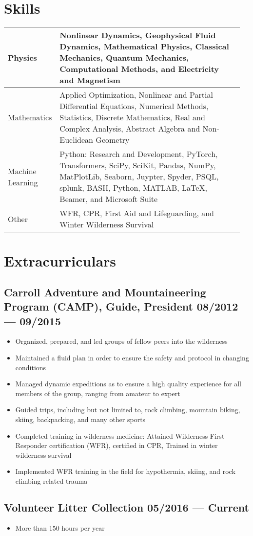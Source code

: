 \documentclass[letterpaper,11pt]{article}
\begin{document}
\section{\color{cvblue}Skills}
\vspace{-.25in}
\begin{table}[h!]
    \centering
    \begin{tabular}{p{0.16\linewidth} || p{0.8\linewidth}}
         Physics& Nonlinear Dynamics, Geophysical Fluid Dynamics, Mathematical Physics, Classical Mechanics,
Quantum Mechanics, Computational Methods, and Electricity and Magnetism \\\hline
         Mathematics& Applied Optimization, Nonlinear and Partial Differential Equations, Numerical Methods, Statistics, Discrete Mathematics, Real and Complex Analysis, Abstract Algebra and Non-Euclidean Geometry \\\hline
         Machine Learning & Python: Research and Development, PyTorch, Transformers, SciPy, SciKit, Pandas, NumPy, MatPlotLib, Seaborn, Juypter, Spyder, PSQL, splunk, BASH, Python, MATLAB, \LaTeX,  Beamer, and Microsoft Suite \\\hline
         Other& WFR, CPR, First Aid and Lifeguarding, and Winter Wilderness Survival\\\hline
    \end{tabular}
\end{table}



\section{\color{cvblue}Extracurriculars }

\subsection*{{\color{cvblue}Carroll Adventure and Mountaineering Program (CAMP), Guide, President} \hfill 08/2012 --- 09/2015} 
    \begin{itemize}
\item  Organized, prepared, and led groups of fellow peers into the wilderness
\item  Maintained a fluid plan in order to ensure the safety and protocol in changing conditions
\item  Managed dynamic expeditions as to ensure a high quality experience for all members of the group, ranging from amateur to expert
\item  Guided trips, including but not limited to, rock climbing, mountain biking, skiing, backpacking, and
many other sports
\item  Completed training in wilderness medicine: Attained Wilderness First Responder certification (WFR), certified in CPR, Trained in winter wilderness survival
\item Implemented WFR training in the field for hypothermia, skiing, and  rock climbing related trauma      \end{itemize}



\subsection*{\color{cvblue}Volunteer Litter Collection \hfill 05/2016 --- Current} 
    \begin{itemize}
        \item More than 150 hours per year
     \end{itemize}
\end{document}
